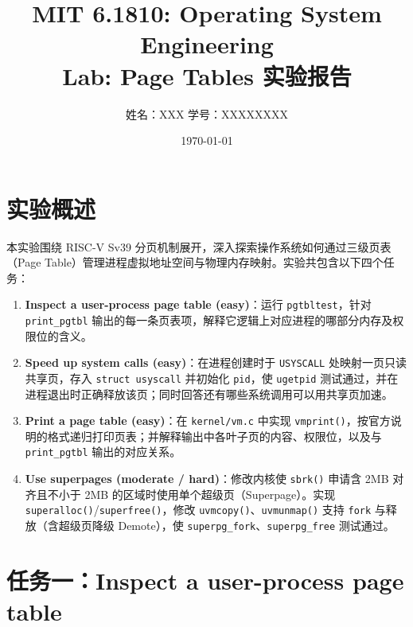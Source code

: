 \documentclass[12pt, a4paper]{ctexart}
\title{\textbf{MIT 6.1810: Operating System Engineering \\ Lab: Page Tables 实验报告}}
\author{姓名：XXX \quad 学号：XXXXXXXX}
\date{\today}
\begin{document}
\maketitle
\tableofcontents
\newpage

\section{实验概述}
本实验围绕 RISC-V Sv39 分页机制展开，深入探索操作系统如何通过三级页表（Page Table）管理进程虚拟地址空间与物理内存映射。实验共包含以下四个任务：
\begin{enumerate}
    \item \textbf{Inspect a user-process page table (easy)}：运行 \texttt{pgtbltest}，针对 \texttt{print\_pgtbl} 输出的每一条页表项，解释它逻辑上对应进程的哪部分内存及权限位的含义。
    \item \textbf{Speed up system calls (easy)}：在进程创建时于 \texttt{USYSCALL} 处映射一页只读共享页，存入 \texttt{struct usyscall} 并初始化 \texttt{pid}，使 \texttt{ugetpid} 测试通过，并在进程退出时正确释放该页；同时回答还有哪些系统调用可以用共享页加速。
    \item \textbf{Print a page table (easy)}：在 \texttt{kernel/vm.c} 中实现 \texttt{vmprint()}，按官方说明的格式递归打印页表；并解释输出中各叶子页的内容、权限位，以及与 \texttt{print\_pgtbl} 输出的对应关系。
    \item \textbf{Use superpages (moderate / hard)}：修改内核使 \texttt{sbrk()} 申请含 2MB 对齐且不小于 2MB 的区域时使用单个超级页（Superpage）。实现 \texttt{superalloc()}/\texttt{superfree()}，修改 \texttt{uvmcopy()}、\texttt{uvmunmap()} 支持 \texttt{fork} 与释放（含超级页降级 Demote），使 \texttt{superpg\_fork}、\texttt{superpg\_free} 测试通过。
\end{enumerate}

\section{任务一：Inspect a user-process page table}
\end{document}
